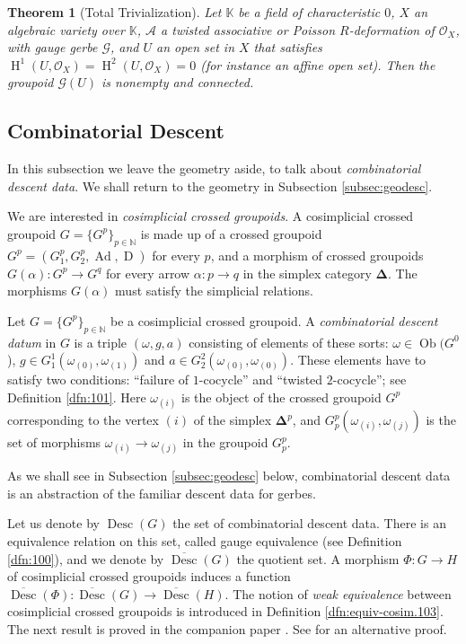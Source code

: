 \documentclass[a4paper, 10pt]{amsart}
\newtheorem{thm}[equation]{Theorem}
\theoremstyle{definition}
\numberwithin{equation}{section}
\newcommand{\opn}{\operatorname}
\newcommand{\ol}{\overline}
\newcommand{\mcal}[1]{\mathcal{#1}}
\newcommand{\mbb}[1]{\mathbb{#1}}
\newcommand{\tup}[1]{\textup{#1}}
\newcommand{\bsym}[1]{\boldsymbol{#1}}
\newcommand{\K}{\mbb{K}}
\newcommand{\N}{\mbb{N}}
\newcommand{\om}{\omega}
\newcommand{\al}{\alpha}
\newcommand{\OX}{\mcal{O}_X}
\newcommand{\gerbe}[1]{\bsym{\mcal{#1}}}
\begin{document}
\begin{thm}[Total Trivialization] \label{thm:17}
Let $\K$ be a field of characteristic $0$, $X$ an algebraic variety over
$\K$, $\gerbe{A}$ a twisted associative or Poisson $R$-deformation of 
$\OX$, with gauge gerbe $\gerbe{G}$, and $U$ an open set in $X$
that satisfies 
$\opn{H}^1(U, \OX) = \opn{H}^2(U, \OX) = 0$
\tup{(}for instance an affine open set\tup{)}. 
Then the groupoid $\gerbe{G}(U)$ is nonempty and connected.
\end{thm}


\subsection{Combinatorial Descent} \label{subsec:combinat}
In this subsection we leave the geometry aside, to talk about {\em combinatorial
descent data}. We shall return to the geometry in Subsection
\ref{subsec:geodesc}. 

We are interested in {\em cosimplicial crossed groupoids}. 
A cosimplicial crossed group\-oid 
$G = \{ G^p \}_{p \in \N}$
is made up of a crossed groupoid 
$G^p = ( G^p_1, G^p_2, \opn{Ad}, \opn{D})$ 
for every $p$, and a morphism of crossed groupoids
$G(\al) : G^p \to G^q$
for every arrow $\al : p \to q$ in the simplex category $\bsym{\Delta}$.
The morphisms $G(\al)$ must satisfy the simplicial relations. 

Let $G = \{ G^p \}_{p \in \N}$
be a cosimplicial crossed groupoid. A {\em combinatorial descent datum} in
$G$ is a triple $(\om, g, a)$ consisting of elements of these sorts: 
$\om \in \opn{Ob}(G^0$),
$g \in G^1_1(\om_{(0)}, \om_{(1)})$
and 
$a \in G^2_2(\om_{(0)}, \om_{(0)})$.
These elements have to satisfy two conditions: ``failure of $1$-cocycle'' and 
``twisted $2$-cocycle''; see Definition \ref{dfn:101}. 
Here $\om_{(i)}$ is the object of the crossed groupoid $G^p$
corresponding to the vertex $(i)$ of the simplex $\bsym{\Delta}^p$, and
$G^p_p(\om_{(i)}, \om_{(j)})$ is the set of morphisms
$\om_{(i)} \to \om_{(j)}$ in the groupoid $G^p_p$. 

As we shall see in Subsection \ref{subsec:geodesc} below, combinatorial descent
data is an abstraction of the familiar descent data for gerbes.

Let us denote by $\opn{Desc}(G)$ the set of combinatorial descent data.
There is an equivalence relation on this set, called gauge equivalence (see
Definition \ref{dfn:100}), and we denote by 
$\ol{\opn{Desc}}(G)$ the quotient set. A morphism 
$\Phi : G \to H$ of cosimplicial crossed groupoids induces a
function 
$\ol{\opn{Desc}}(\Phi) : \ol{\opn{Desc}}(G) \to
\ol{\opn{Desc}}(H)$.
The notion of {\em weak equivalence} between cosimplicial crossed groupoids is
introduced in Definition \ref{dfn:equiv-cosim.103}. 
The next result is proved in the companion paper \cite{Ye8}.
See \cite{Pr} for an alternative proof. 
\end{document}
